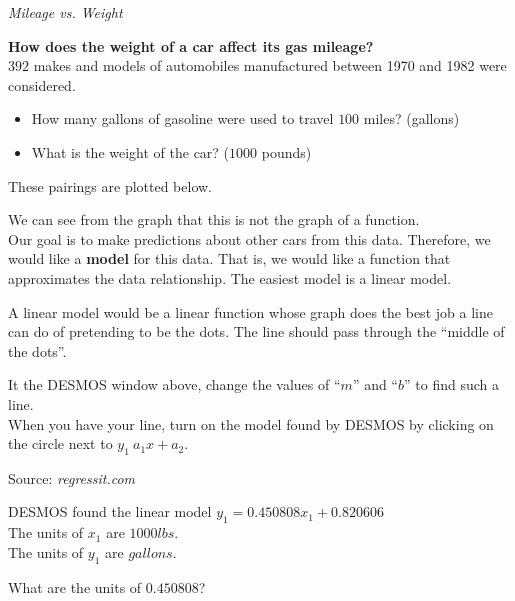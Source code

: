 \documentclass{ximera}
\begin{document}
\begin{model} \textit{Mileage vs. Weight}

\textbf{How does the weight of a car affect its gas mileage?} \\



$392$ makes and models of automobiles manufactured between 1970 and 1982 were considered.  

\begin{itemize}
\item How many gallons of gasoline were used to travel $100$ miles?   (gallons)
\item What is the weight of the car?    ($1000$ pounds)
\end{itemize}


These pairings are plotted below.




\begin{center}
\end{center}


We can see from the graph that this is not the graph of a function.  \\


Our goal is to make predictions about other cars from this data.  Therefore, we would like a \textbf{model} for this data.  That is, we would like a function that approximates the data relationship.  The easiest model is a linear model.


A linear model would be a linear function whose graph does the best job a line can do of pretending to be the dots.  The line should pass through the ``middle of the dots''.

It the DESMOS window above, change the values of ``$m$'' and ``$b$'' to find such a line. \\

When you have your line, turn on the model found by DESMOS by clicking on the circle next to $y_1 ~ a_1 x + a_2$.


Source:   \textit{regressit.com}
\end{model}



\begin{question}


DESMOS found the linear model $y_1 = 0.450808 x_1 + 0.820606$ \\


The units of $x_1$ are $1000 lbs$. \\
The units of $y_1$ are $gallons$.



What are the units of $0.450808$?

\begin{multipleChoice}
\end{multipleChoice}


\end{question}
\end{document}
